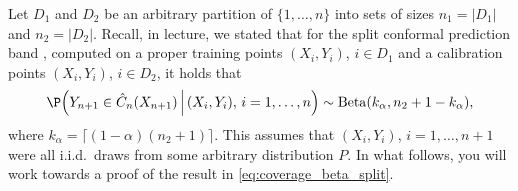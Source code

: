 \documentclass{article}
\begin{document}
Let $D_1$ and $D_2$ be an arbitrary partition of $\{1,\dots,n\}$ into sets of
sizes $n_1=|D_1|$ and $n_2=|D_2|$. Recall, in lecture, we stated that for the
split conformal prediction band , computed on a proper training
points $(X_i,Y_i)$, $i \in D_1$ and a calibration points $(X_i,Y_i)$, $i \in
D_2$, it holds that  
\begin{equation}
\label{eq:coverage_beta_split}
\P\Big(Y_{n+1} \in \hC_n(X_{n+1}) \, \Big| \, (X_i,Y_i), \, i=1,\dots,n \Big) 
\sim \mathrm{Beta}(k_\alpha, n_2+1-k_\alpha), 
\end{equation}
where $k_\alpha = \lceil (1-\alpha)(n_2+1) \rceil$. This assumes that
$(X_i,Y_i)$, $i=1,\dots,n+1$ were all i.i.d.\ draws from some arbitrary
distribution $P$. In what follows, you will work towards a proof of the result
in \eqref{eq:coverage_beta_split}.   
\end{document}
